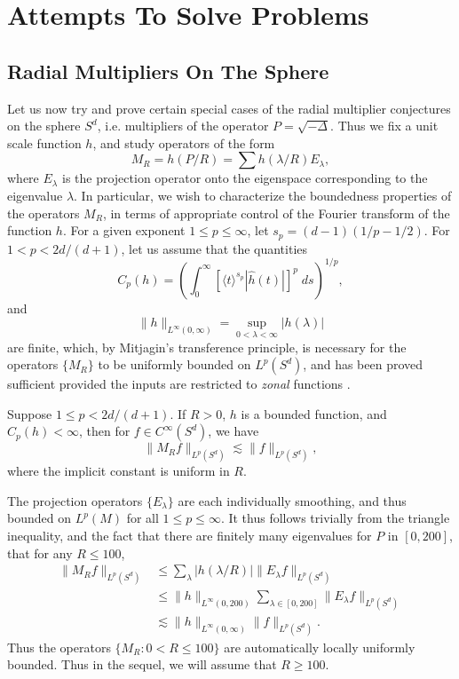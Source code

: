 \part{Attempts To Solve Problems}

\chapter{Radial Multipliers On The Sphere}

Let us now try and prove certain special cases of the radial multiplier conjectures on the sphere $S^d$, i.e. multipliers of the operator $P = \sqrt{-\Delta}$. Thus we fix a unit scale function $h$, and study operators of the form
%
\[ M_R = h \left( P / R \right) = \sum h(\lambda / R) E_\lambda, \]
%
where $E_\lambda$ is the projection operator onto the eigenspace corresponding to the eigenvalue $\lambda$. In particular, we wish to characterize the boundedness properties of the operators $M_R$, in terms of appropriate control of the Fourier transform of the function $h$. For a given exponent $1 \leq p \leq \infty$, let $s_p = (d-1)(1/p - 1/2)$. For $1 < p < 2d/(d+1)$, let us assume that the quantities
%
\[ C_p(h) = \left( \int_0^\infty \left[ \langle t \rangle^{s_p} |\widehat{h}(t)| \right]^p\; ds \right)^{1/p}, \]
%
and
%
\[ \| h \|_{L^\infty(0,\infty)} = \sup_{0 < \lambda < \infty} |h(\lambda)| \]
%
are finite, which, by Mitjagin's transference principle, is necessary for the operators $\{ M_R \}$ to be uniformly bounded on $L^p(S^d)$, and has been proved sufficient provided the inputs are restricted to \emph{zonal} functions \cite{Alladi}.

\begin{theorem} \label{MainSphereTheorem}
    Suppose $1 \leq p < 2d/(d+1)$. If $R > 0$, $h$ is a bounded function, and $C_p(h) < \infty$, then for $f \in C^\infty(S^d)$, we have
    \[ \| M_R f \|_{L^p(S^d)} \lesssim \| f \|_{L^p(S^d)}, \]
    where the implicit constant is uniform in $R$.
\end{theorem}

The projection operators $\{ E_\lambda \}$ are each individually smoothing, and thus bounded on $L^p(M)$ for all $1 \leq p \leq \infty$. It thus follows trivially from the triangle inequality, and the fact that there are finitely many eigenvalues for $P$ in $[0,200]$, that for any $R \leq 100$,
%
\begin{align*}
    \| M_R f \|_{L^p(S^d)} &\leq \sum_\lambda |h(\lambda/R)| \| E_\lambda f \|_{L^p(S^d)}\\
    &\leq \| h \|_{L^\infty(0,200)} \sum\nolimits_{\lambda \in [0,200]} \| E_\lambda f \|_{L^p(S^d)}\\
    &\lesssim \| h \|_{L^\infty(0,\infty)} \| f \|_{L^p(S^d)}.
\end{align*}
%
Thus the operators $\{ M_R : 0 < R \leq 100 \}$ are automatically locally uniformly bounded. Thus in the sequel, we will assume that $R \geq 100$.

